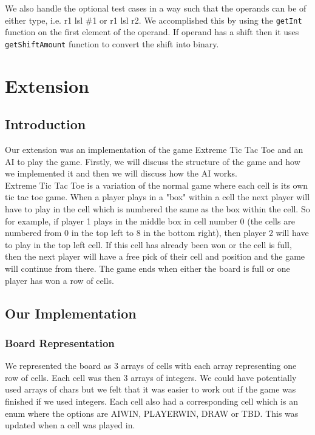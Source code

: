 \documentclass[11pt]{article}
\begin{document}
We also handle the optional test cases in a way such that the operands can be of either type, i.e. r1 lsl \#1 or r1 lsl r2. We accomplished this by using the {\tt{getInt}} function on the first element of the operand. If operand has a shift then it uses {\tt{getShiftAmount}} function to convert the shift into binary.

\section{Extension}
\subsection{Introduction}
Our extension was an implementation of the game Extreme Tic Tac Toe and an AI to play the game. Firstly, we will discuss the structure of the game and how we implemented it and then we will discuss how the AI works.
\\Extreme Tic Tac Toe is a variation of the normal game where each cell is its own tic tac toe game. When a player plays in a "box" within a cell the next player will have to play in the cell which is numbered the same as the box within the cell. So for example, if player 1 plays in the middle box in cell number 0 (the cells are numbered from 0 in the top left to 8 in the bottom right), then player 2 will have to play in the top left cell. If this cell has already been won or the cell is full, then the next player will have a free pick of their cell and position and the game will continue from there. The game ends when either the board is full or one player has won a row of cells.
\subsection{Our Implementation}
\subsubsection{Board Representation}
We represented the board as 3 arrays of cells with each array representing one row of cells. Each cell was then 3 arrays of integers. We could have potentially used arrays of chars but we felt that it was easier to work out if the game was finished if we used integers. Each cell also had a corresponding cell which is an enum where the options are AIWIN, PLAYERWIN, DRAW or TBD. This was updated when a cell was played in.
\end{document}
